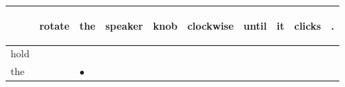 \documentclass[landscape]{article}
\newcommand{\ssp}{\hspace{2pt}}
\newcommand{\mex}{\cellcolor{g}$\bullet$}
\begin{document}
\noindent\begin{tabular}{|l|p{10pt}|p{10pt}|p{10pt}|p{10pt}|p{10pt}|p{10pt}|p{10pt}|p{10pt}|p{10pt}|}
\hline
&\begin{sideways}\cellcolor{ref0}rotate\hspace{12pt}\end{sideways}&\begin{sideways}\cellcolor{ref1}the\hspace{12pt}\end{sideways}&\begin{sideways}\cellcolor{ref2}speaker\hspace{12pt}\end{sideways}&\begin{sideways}\cellcolor{ref3}knob\hspace{12pt}\end{sideways}&\begin{sideways}\cellcolor{ref4}clockwise\hspace{12pt}\end{sideways}&\begin{sideways}\cellcolor{ref5}until\hspace{12pt}\end{sideways}&\begin{sideways}\cellcolor{ref6}it\hspace{12pt}\end{sideways}&\begin{sideways}\cellcolor{ref7}clicks\hspace{12pt}\end{sideways}&\begin{sideways}\cellcolor{ref8}.\hspace{12pt}\end{sideways}\\
\hline
\ssp hold \ssp&\hspace{2pt}&\hspace{2pt}&\hspace{2pt}&\hspace{2pt}&\hspace{2pt}&\hspace{2pt}&\hspace{2pt}&\hspace{2pt}&\hspace{2pt}\\
\hline
\ssp \cellcolor{ref1}the \ssp&\hspace{2pt}&\hspace{2pt}\mex&\hspace{2pt}&\hspace{2pt}&\hspace{2pt}&\hspace{2pt}&\hspace{2pt}&\hspace{2pt}&\hspace{2pt}\\

\end{tabular}
\end{document}
